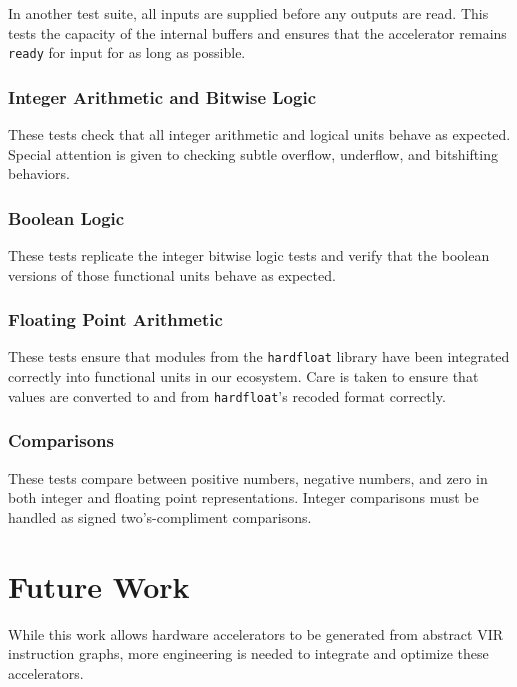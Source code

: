 \documentclass[sigconf, nonacm]{acmart}
\begin{document}
In another test suite, all inputs are supplied before any outputs are read.
This tests the capacity of the internal buffers and ensures that the accelerator remains \texttt{ready} for input for as long as possible.

\subsubsection{Integer Arithmetic and Bitwise Logic}

These tests check that all integer arithmetic and logical units behave as expected.
Special attention is given to checking subtle overflow, underflow, and bitshifting behaviors.

\subsubsection{Boolean Logic}

These tests replicate the integer bitwise logic tests and verify that the boolean versions of those functional units behave as expected.

\subsubsection{Floating Point Arithmetic}

These tests ensure that modules from the \texttt{hardfloat} library have been integrated correctly into functional units in our ecosystem.
Care is taken to ensure that values are converted to and from \texttt{hardfloat}'s recoded format correctly.

\subsubsection{Comparisons}

These tests compare between positive numbers, negative numbers, and zero in both integer and floating point representations.
Integer comparisons must be handled as signed two's-compliment comparisons.


\section{Future Work}

While this work allows hardware accelerators to be generated from abstract VIR instruction graphs, more engineering is needed to integrate and optimize these accelerators.
\end{document}
